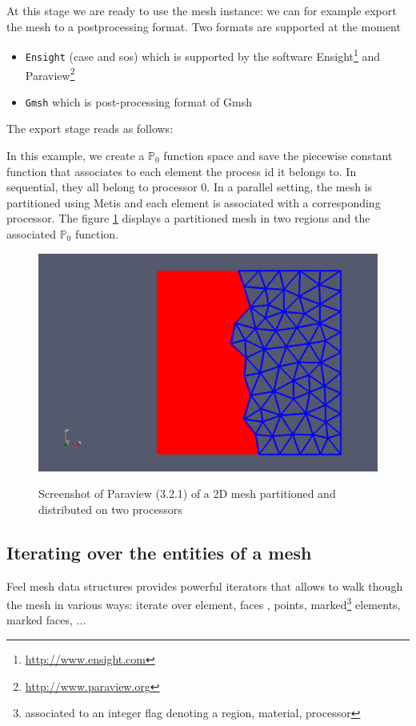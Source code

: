 \documentclass[a4paper]{book}
\newcommand{\polyP}[1]{\ensuremath{\mathbb{P}_{#1}}\xspace}
\newcommand{\feel}{Feel\xspace}
\begin{document}



At this stage we are ready to use the mesh instance: we can for
example export the mesh to a postprocessing format. Two formats are
supported at the moment
\begin{itemize}
\item \lstinline!Ensight! (case and sos) which is supported by the
  software Ensight\footnote{\url{http://www.ensight.com}} and
  Paraview\footnote{\url{http://www.paraview.org}}
\item \lstinline!Gmsh! which is post-processing format of Gmsh
\end{itemize}

The export stage reads as follows:



In this example, we create a $\polyP{0}$ function space and save the
piecewise constant function that associates to each element the
process id it belongs to. In sequential, they all belong to processor
0.  In a parallel setting, the mesh is partitioned using Metis and
each element is associated with a corresponding processor. The figure
\ref{fig:1} displays a partitioned mesh in two regions and the
associated $\polyP{0}$ function.

\begin{figure}[htbp]
  \centering
  \includegraphics[width=.7\linewidth]{mymeshpartition}
  \label{fig:1}
  \caption{Screenshot of Paraview (3.2.1) of a 2D mesh partitioned and distributed on two processors}
\end{figure}


\subsection{Iterating over the entities of a mesh}

\feel mesh data structures provides powerful iterators that allows to
walk though the mesh in various ways: iterate over element, faces ,
points, marked\footnote{associated to an integer flag denoting a
  region, material, processor} elements, marked faces, ...
\end{document}
